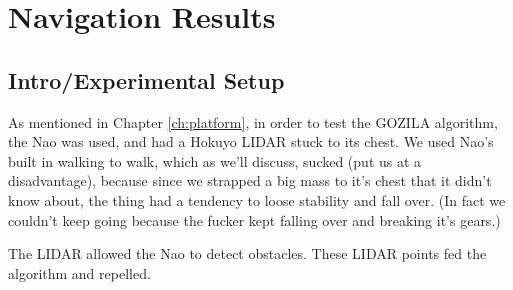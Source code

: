 \chapter{Navigation Results} \label{ch:results_navigation}




\section{Intro/Experimental Setup}
As mentioned in Chapter \ref{ch:platform}, in order to test the GOZILA algorithm,
the Nao was used, and had a Hokuyo LIDAR stuck to its chest.
We used Nao's built in walking to walk, which as we'll discuss, sucked (put us at a disadvantage),
because since we strapped a big mass to it's chest that it didn't know about,
the thing had a tendency to loose stability and fall over.
(In fact we couldn't keep going because the fucker kept falling over and breaking it's gears.)

The LIDAR allowed the Nao to detect obstacles. These LIDAR points fed the algorithm and repelled.


